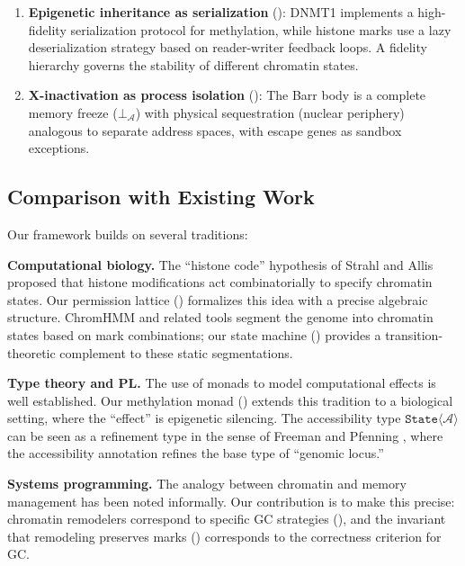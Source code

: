 \documentclass[12pt,a4paper]{article}
\newcommand{\StateT}{\texttt{State}}
\begin{document}
\begin{enumerate}
    \item \textbf{Epigenetic inheritance as serialization} (): DNMT1 implements a high-fidelity serialization protocol for methylation, while histone marks use a lazy deserialization strategy based on reader-writer feedback loops. A fidelity hierarchy governs the stability of different chromatin states.

    \item \textbf{X-inactivation as process isolation} (): The Barr body is a complete memory freeze ($\bot_{\mathcal{A}}$) with physical sequestration (nuclear periphery) analogous to separate address spaces, with escape genes as sandbox exceptions.
\end{enumerate}

\subsection{Comparison with Existing Work}

Our framework builds on several traditions:

\textbf{Computational biology.} The ``histone code'' hypothesis of Strahl and Allis \cite{strahl2000} proposed that histone modifications act combinatorially to specify chromatin states. Our permission lattice () formalizes this idea with a precise algebraic structure. ChromHMM \cite{ernst2012} and related tools segment the genome into chromatin states based on mark combinations; our state machine () provides a transition-theoretic complement to these static segmentations.

\textbf{Type theory and PL.} The use of monads to model computational effects \cite{moggi1991} is well established. Our methylation monad () extends this tradition to a biological setting, where the ``effect'' is epigenetic silencing. The accessibility type $\StateT\langle\mathcal{A}\rangle$ can be seen as a refinement type in the sense of Freeman and Pfenning \cite{freeman1991}, where the accessibility annotation refines the base type of ``genomic locus.''

\textbf{Systems programming.} The analogy between chromatin and memory management has been noted informally. Our contribution is to make this precise: chromatin remodelers correspond to specific GC strategies (), and the invariant that remodeling preserves marks () corresponds to the correctness criterion for GC.
\end{document}

